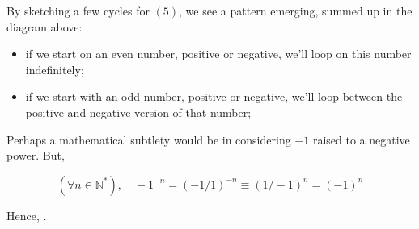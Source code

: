\documentclass[solutions.tex]{subfiles}
\begin{document}
\hr

\begin{figure}[H]
	\centering
\end{figure}

By sketching a few cycles for $(5)$, we see a pattern emerging, summed
up in the diagram above:
\begin{itemize}
	\item if we start on an even number, positive or negative, we'll loop
	on this number indefinitely;
	\item if we start with an odd number, positive or negative,
	we'll loop between the positive and negative version of
	that number;
\end{itemize}

Perhaps a mathematical subtlety would be in considering $-1$ raised to
a negative power. But,

\[ (\forall n \in \mathbb{N}^*),\quad -1^{-n} = (-1/1)^{-n} \equiv (1/-1)^n = (-1)^n \]

Hence, .
\end{document}
